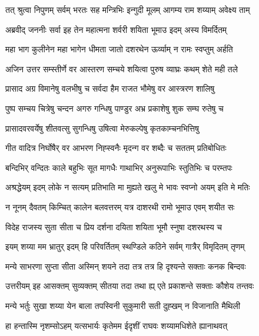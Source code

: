 
\twolineshloka
{तत् श्रुत्वा निपुणम् सर्वम् भरतः सह मन्त्रिभिः}
{इन्गुदी मूलम् आगम्य राम शय्याम् अवेक्ष्य ताम्} %

\twolineshloka
{अब्रवीद् जननीः सर्वा इह तेन महात्मना}
{शर्वरी शयिता भूमाउ इदम् अस्य विमर्दितम्} %

\twolineshloka
{महा भाग कुलीनेन महा भागेन धीमता}
{जातो दशरथेन ऊर्व्याम् न रामः स्वप्तुम् अर्हति} %

\twolineshloka
{अजिन उत्तर सम्स्तीर्णे वर आस्तरण सम्चये}
{शयित्वा पुरुष व्याघ्रः कथम् शेते मही तले} %

\twolineshloka
{प्रासाद अग्र विमानेषु वलभीषु च सर्वदा}
{हैम राजत भौमेषु वर आस्त्ररण शालिषु} %

\twolineshloka
{पुष्प सम्चय चित्रेषु चन्दन अगरु गन्धिषु}
{पाण्डुर अभ्र प्रकाशेषु शुक सम्घ रुतेषु च} %

\twolineshloka
{प्रासादवरवर्येषु शीतवत्सु सुगन्धिषु}
{उषित्वा मेरुकल्पेषु कृतकाम्चनभित्तिषु} %

\twolineshloka
{गीत वादित्र निर्घोषैर् वर आभरण निह्स्वनैः}
{मृदन्ग वर शब्दैः च सततम् प्रतिबोधितः} %

\twolineshloka
{बन्दिभिर् वन्दितः काले बहुभिः सूत मागधैः}
{गाथाभिर् अनुरूपाभिः स्तुतिभिः च परम्तपः} %

\twolineshloka
{अश्रद्धेयम् इदम् लोके न सत्यम् प्रतिभाति मा}
{मुह्यते खलु मे भावः स्वप्नो अयम् इति मे मतिः} %

\twolineshloka
{न नूनम् दैवतम् किम्चित् कालेन बलवत्तरम्}
{यत्र दाशरथी रामो भूमाउ एवम् शयीत सः} %

\twolineshloka
{विदेह राजस्य सुता सीता च प्रिय दर्शना}
{दयिता शयिता भूमौ स्नुषा दशरथस्य च} %

\twolineshloka
{इयम् शय्या मम भ्रातुर् इदम् हि परिवर्तितम्}
{स्थण्डिले कठिने सर्वम् गात्रैर् विमृदितम् तृणम्} %

\twolineshloka
{मन्ये साभरणा सुप्ता सीता अस्मिन् शयने तदा}
{तत्र तत्र हि दृश्यन्ते सक्ताः कनक बिन्दवः} %

\twolineshloka
{उत्तरीयम् इह आसक्तम् सुव्यक्तम् सीतया तदा}
{तथा ह्य् एते प्रकाशन्ते सक्ताः कौशेय तन्तवः} %

\twolineshloka
{मन्ये भर्तुः सुखा शय्या येन बाला तपस्विनी}
{सुकुमारी सती दुह्खम् न विजानाति मैथिली} %

\twolineshloka
{हा हन्तास्मि नृशम्सोऽहम् यत्सभार्यः कृतेमम}
{ईदृशीं राघवः शय्यामधिशेते ह्यानाथवत्} %

